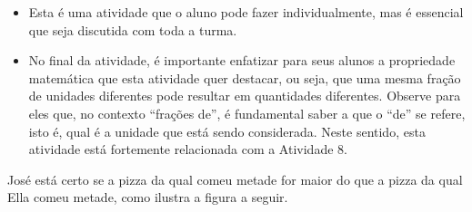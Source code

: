 \begin{orientacoes}
  \begin{itemize} %
    \item       Esta é uma atividade que o aluno pode fazer individualmente, mas é essencial que seja discutida com toda a turma.
    \item       No final da atividade, é importante enfatizar para seus alunos a propriedade matemática que esta atividade quer destacar, ou seja, que uma mesma fração de unidades diferentes pode resultar em quantidades diferentes. Observe para eles que, no contexto       ``frações de'', é fundamental saber a que o       ``de''     se refere, isto é, qual é a unidade que está sendo considerada. Neste sentido, esta atividade está fortemente relacionada com a Atividade 8.
\end{itemize} %


\end{orientacoes}

\begin{solucao}{}{}
  José está certo se a pizza da qual comeu metade for maior do que a pizza da qual Ella comeu metade, como ilustra a figura a seguir.
  \begin{center}

  \end{center}

  \end{solucao}

